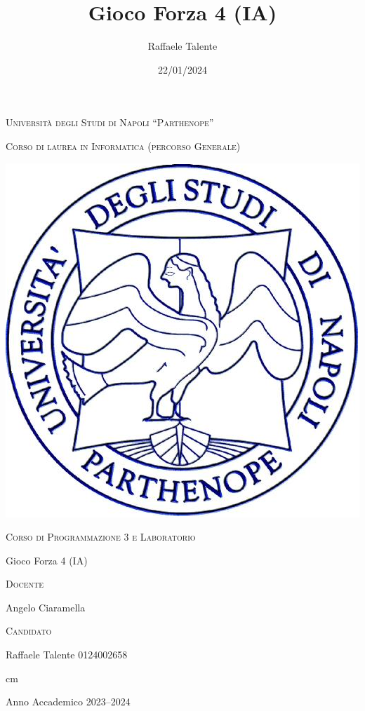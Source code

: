 \documentclass[11pt,italian,a4paper,oneside,openright]{article}
\title{Gioco Forza 4 (IA)}
\author{Raffaele Talente}
\date{22/01/2024}
\begin{document}
    \vskip 1cm \large \centerline{\textsc{Università degli Studi di
    Napoli ``Parthenope''}}

    \centerline {\small\textsc{Corso di laurea in Informatica
        (percorso Generale)}}

    \begin{center}
        \includegraphics[scale=0.24]{logo_parthenope}
    \end{center}

    \vskip 0.5cm

    \large \centerline {\textsc{Corso di Programmazione 3 e Laboratorio}}

    \vskip 0.5cm

    \Large \centerline {Gioco Forza 4 (IA)}


    \vskip 4.5cm


    \large
    \begin{minipage}[t]{7cm}
        \textsc{Docente}

        Angelo Ciaramella\\

    \end{minipage}
    \hfill
    \begin{minipage}[t]{5cm}
        \hfill \textsc{Candidato}

        \hfill Raffaele Talente
        \hfill 0124002658
    \end{minipage}

     cm \Large \centerline {Anno Accademico 2023--2024}
    \vfill \eject

    \tableofcontents

    \newpage

    
    
    
    
    
    

    \newpage
    \pagestyle{plain}
\end{document}

